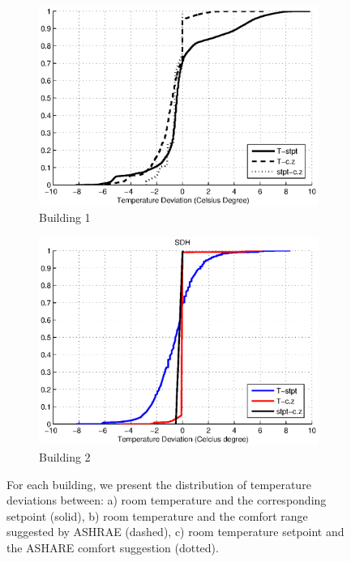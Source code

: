 \begin{figure}[h!]
\centering
	\begin{subfigure}{0.48\textwidth}
                \centering
		\includegraphics[width=\textwidth]{./figs/Soda_new.eps}
                \caption{Building 1}
	\end{subfigure}
	\begin{subfigure}{0.48\textwidth}
                \centering
		\includegraphics[width=\textwidth]{./figs/SDH_new.eps}
                \caption{Building 2}
	\end{subfigure}
\caption{For each building, we present the distribution of temperature deviations between: a) room temperature and the corresponding setpoint (solid), b) room temperature and the comfort range suggested by ASHRAE (dashed), c) room temperature setpoint and the ASHARE comfort suggestion (dotted).}
\label{fig:cdf_temp}
\end{figure}

